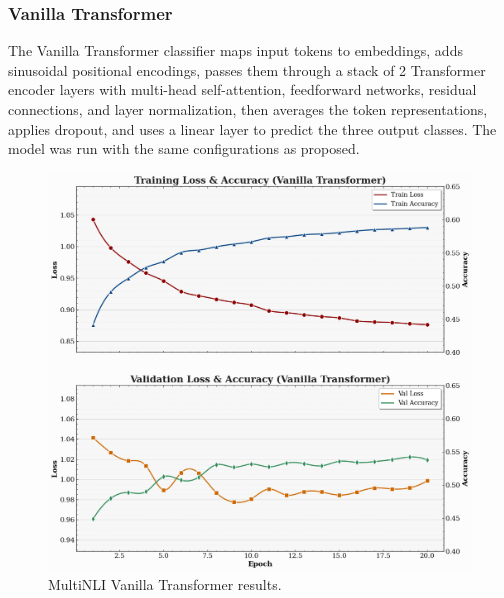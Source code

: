 \documentclass{article}
\begin{document}
\vspace{6cm}
\noindent
\subsubsection{Vanilla Transformer}


The Vanilla Transformer classifier maps input tokens to embeddings, adds sinusoidal positional encodings, passes them through a stack of 2 Transformer encoder layers with multi-head self-attention, feedforward networks, residual connections, and layer normalization, then averages the token representations, applies dropout, and uses a linear layer to predict the three output classes. The model was run with the same configurations as proposed. 

\begin{figure}[H]
    \centering
    \includegraphics[width=0.7\linewidth]{b_mnli_van_trans.png}
    \caption{MultiNLI Vanilla Transformer results.}
    \label{fig:a}
\end{figure}
\end{document}
